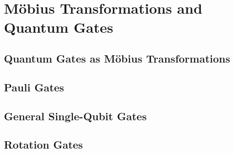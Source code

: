 \section{Möbius Transformations and Quantum Gates}
\label{sec:mobius}


\subsection{Quantum Gates as Möbius Transformations}

\subsection{Pauli Gates}

\subsection{General Single-Qubit Gates}

\subsection{Rotation Gates}
